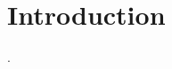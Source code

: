 \documentclass[../AdvancementSummary.tex]{subfiles}
\begin{document}
\section{Introduction}. 

%
%
%
%
\end{document}
